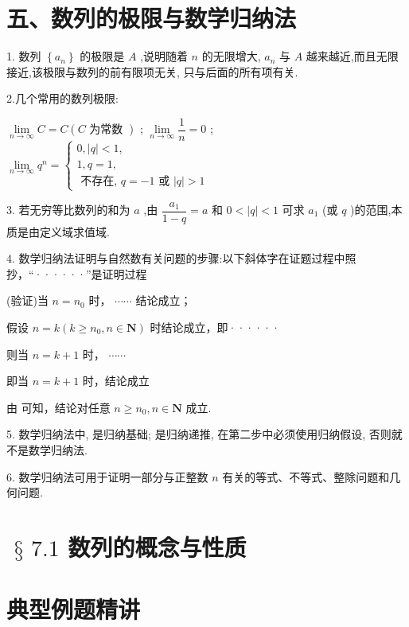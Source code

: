 \section*{五、数列的极限与数学归纳法}

1. 数列 $\left\{  {a}_{n}\right\}$ 的极限是 $A$ ,说明随着 $n$ 的无限增大, ${a}_{n}$ 与 $A$ 越来越近,而且无限接近,该极限与数列的前有限项无关, 只与后面的所有项有关.

2.几个常用的数列极限:

   $\mathop{\lim }\limits_{{n \rightarrow  \infty }}C = C\left( {C\text{ 为常数 }}\right)$ ;    $\mathop{\lim }\limits_{{n \rightarrow  \infty }}\dfrac{1}{n} = 0$ ;    $\mathop{\lim }\limits_{{n \rightarrow  \infty }}{q}^{n} = \left\{  \begin{array}{l} 0,\left| q\right|  < 1, \\  1,q = 1, \\  \text{ 不存在, }q =  - 1\text{ 或 }\left| q\right|  > 1 \end{array}\right.$

3. 若无穷等比数列的和为 $a$ ,由 $\dfrac{{a}_{1}}{1 - q} = a$ 和 $0 < \left| q\right|  < 1$ 可求 ${a}_{1}$ (或 $q$ )的范围,本质是由定义域求值域.

4. 数学归纳法证明与自然数有关问题的步骤:以下斜体字在证题过程中照抄，“······”是证明过程

   (验证)当 $n = {n}_{0}$ 时， $\cdots \cdots$ 结论成立；

   假设 $n = k\left( {k \geq  {n}_{0},n \in  \mathbf{N}}\right)$ 时结论成立，即······

则当 $n = k + 1$ 时， $\cdots \cdots$

即当 $n = k + 1$ 时，结论成立

由    可知，结论对任意 $n \geq  {n}_{0},n \in  \mathbf{N}$ 成立.

5. 数学归纳法中,   是归纳基础;   是归纳递推, 在第二步中必须使用归纳假设, 否则就不是数学归纳法.

6. 数学归纳法可用于证明一部分与正整数 $n$ 有关的等式、不等式、整除问题和几何问题.

\section*{$\text{ § }{7.1}$ 数列的概念与性质}

\section*{典型例题精讲}

